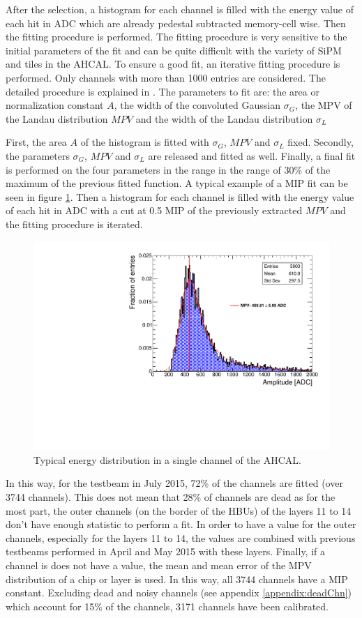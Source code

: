 After the selection, a histogram for each channel is filled with the energy value of each hit in ADC which are already pedestal subtracted memory-cell wise. Then the fitting procedure is performed. The fitting procedure is very sensitive to the initial parameters of the fit and can be quite difficult with the variety of SiPM and tiles in the AHCAL. To ensure a good fit, an iterative fitting procedure is performed. Only channels with more than 1000 entries are considered. The detailed procedure is explained in \cite{FabianThesis}. The parameters to fit are: the area or normalization constant $A$, the width of the convoluted Gaussian $\sigma_G$, the MPV of the Landau distribution $MPV$ and the width of the Landau distribution $\sigma_L$

First, the area $A$ of the histogram is fitted with $\sigma_G$, $MPV$ and $\sigma_L$ fixed. Secondly, the parameters $\sigma_G$, $MPV$ and $\sigma_L$ are released and fitted as well. Finally, a final fit is performed on the four parameters in the range in the range of 30\% of the maximum of the previous fitted function. A typical example of a MIP fit can be seen in figure \ref{fig:MIPFit}. Then a histogram for each channel is filled with the energy value of each hit in ADC with a cut at 0.5 MIP of the previously extracted $MPV$ and the fitting procedure is iterated.

\begin{figure}[htbp!]
	\centering
	\includegraphics[width=0.7\linewidth]{../Thesis_Plots/EnergyCalib/Plots/ExampleMIP_Module3.pdf}
	\caption{Typical energy distribution in a single channel of the AHCAL.} \label{fig:MIPFit}
\end{figure}

In this way, for the testbeam in July 2015, 72\% of the channels are fitted (over 3744 channels). This does not mean that 28\% of channels are dead as for the most part, the outer channels (on the border of the HBUs) of the layers 11 to 14 don't have enough statistic to perform a fit. In order to have a value for the outer channels, especially for the layers 11 to 14, the values are combined with previous testbeams performed in April and May 2015 with these layers. Finally, if a channel is does not have a value, the mean and mean error of the MPV distribution of a chip or layer is used. In this way, all 3744 channels have a MIP constant. Excluding dead and noisy channels (see appendix \ref{appendix:deadChn}) which account for 15\% of the channels, 3171 channels have been calibrated.


